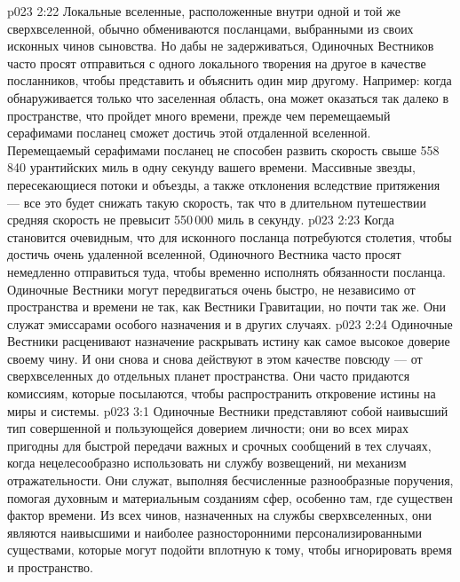 \vs p023 2:22 \pc {}\bibnobreakspace {} Локальные вселенные, расположенные внутри одной и той же сверхвселенной, обычно обмениваются посланцами, выбранными из своих исконных чинов сыновства. Но дабы не задерживаться, Одиночных Вестников часто просят отправиться с одного локального творения на другое в качестве посланников, чтобы представить и объяснить один мир другому. Например: когда обнаруживается только что заселенная область, она может оказаться так далеко в пространстве, что пройдет много времени, прежде чем перемещаемый серафимами посланец сможет достичь этой отдаленной вселенной. Перемещаемый серафимами посланец не способен развить скорость свыше 558\,840 урантийских миль в одну секунду вашего времени. Массивные звезды, пересекающиеся потоки и объезды, а также отклонения вследствие притяжения --- все это будет снижать такую скорость, так что в длительном путешествии средняя скорость не превысит 550\,000 миль в секунду.
\vs p023 2:23 Когда становится очевидным, что для исконного посланца потребуются столетия, чтобы достичь очень удаленной вселенной, Одиночного Вестника часто просят немедленно отправиться туда, чтобы временно исполнять обязанности посланца. Одиночные Вестники могут передвигаться очень быстро, не независимо от пространства и времени не так, как Вестники Гравитации, но почти так же. Они служат эмиссарами особого назначения и в других случаях.
\vs p023 2:24 \pc {}\bibnobreakspace {} Одиночные Вестники расценивают назначение раскрывать истину как самое высокое доверие своему чину. И они снова и снова действуют в этом качестве повсюду --- от сверхвселенных до отдельных планет пространства. Они часто придаются комиссиям, которые посылаются, чтобы распространить откровение истины на миры и системы.
\vs p023 3:1 Одиночные Вестники представляют собой наивысший тип совершенной и пользующейся доверием личности; они во всех мирах пригодны для быстрой передачи важных и срочных сообщений в тех случаях, когда нецелесообразно использовать ни службу возвещений, ни механизм отражательности. Они служат, выполняя бесчисленные разнообразные поручения, помогая духовным и материальным созданиям сфер, особенно там, где существен фактор времени. Из всех чинов, назначенных на службы сверхвселенных, они являются наивысшими и наиболее разносторонними персонализированными существами, которые могут подойти вплотную к тому, чтобы игнорировать время и пространство.
